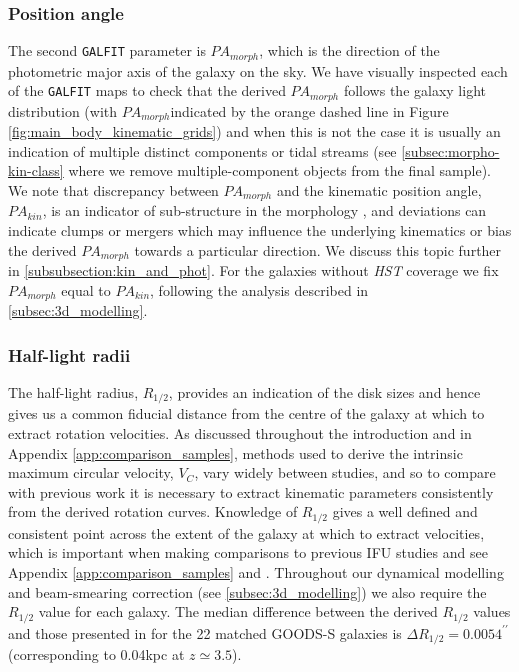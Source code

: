 \documentclass[fleqn,usenatbib]{mn2e}
\begin{document}
\subsubsection{Position angle}\label{subsubsection:position_angle}
The second {\tt GALFIT} parameter is $PA_{morph}$, which is the direction of the photometric major axis of the galaxy on the sky.
We have visually inspected each of the {\tt GALFIT} maps to check that the derived $PA_{morph}$ follows the galaxy light distribution (with $PA_{morph}$indicated by the orange dashed line in Figure \ref{fig:main_body_kinematic_grids}) and when this is not the case it is usually an indication of multiple distinct components or tidal streams (see \cref{subsec:morpho-kin-class} where we remove multiple-component objects from the final sample).
We note that discrepancy between $PA_{morph}$ and the kinematic position angle, $PA_{kin}$, is an indicator of sub-structure in the morphology \citep[e.g.][]{Queyrel2012,Wisnioski2015,Rodrigues2016}, and deviations can indicate clumps or mergers which may influence the underlying kinematics or bias the derived $PA_{morph}$ towards a particular direction.
We discuss this topic further in \cref{subsubsection:kin_and_phot}.
For the galaxies without {\em HST} coverage we fix $PA_{morph}$ equal to $PA_{kin}$, following the analysis described in \cref{subsec:3d_modelling}.


\subsubsection{Half-light radii}\label{subsubsection:half-light_radii}
The half-light radius, $R_{1/2}$, provides an indication of the disk sizes and hence gives us a common fiducial distance from the centre of the galaxy at which to extract rotation velocities.
As discussed throughout the introduction and in Appendix \ref{app:comparison_samples}, methods used to derive the intrinsic maximum circular velocity, $V_{C}$, vary widely between studies, and so to compare with previous work it is necessary to extract kinematic parameters consistently from the derived rotation curves.
Knowledge of $R_{1/2}$ gives a well defined and consistent point across the extent of the galaxy at which to extract velocities, which is important when making comparisons to previous IFU studies and see Appendix \ref{app:comparison_samples} and \citep[e.g.][]{ForsterSchreiber2009,Epinat2012,Wisnioski2015,Stott2016,Harrison2017,Swinbank2017}.
Throughout our dynamical modelling and beam-smearing correction (see \cref{subsec:3d_modelling}) we also require the $R_{1/2}$ value for each galaxy.
The median difference between the derived $R_{1/2}$ values and those presented in \cite{VanderWel2012} for the 22 matched GOODS-S galaxies is $\Delta R_{1/2} = 0.0054^{\prime\prime}$ (corresponding to 0.04kpc at $z\simeq3.5$).
\end{document}
